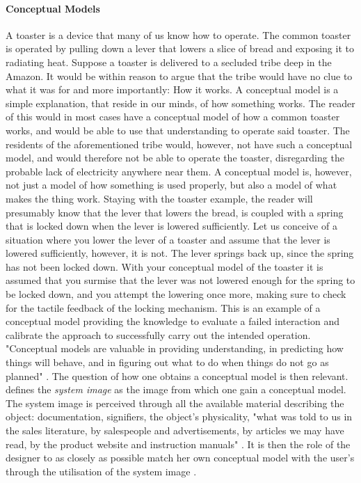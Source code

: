 \paragraph{Conceptual Models} A toaster is a device that many of us know how to operate. The common toaster is operated by pulling down a lever that lowers a slice of bread and exposing it to radiating heat. Suppose a toaster is delivered to a secluded tribe deep in the Amazon. It would be within reason to argue that the tribe would have no clue to what it was for and more importantly: How it works. A conceptual model is a simple explanation, that reside in our minds, of how something works. The reader of this would in most cases have a conceptual model of how a common toaster works, and would be able to use that understanding to operate said toaster. The residents of the aforementioned tribe would, however, not have such a conceptual model, and would therefore not be able to operate the toaster, disregarding the probable lack of electricity anywhere near them. A conceptual model is, however, not just a model of how something is used properly, but also a model of what makes the thing work. Staying with the toaster example, the reader will presumably know that the lever that lowers the bread, is coupled with a spring that is locked down when the lever is lowered sufficiently. Let us conceive of a situation where you lower the lever of a toaster and assume that the lever is lowered sufficiently, however, it is not. The lever springs back up, since the spring has not been locked down. With your conceptual model of the toaster it is assumed that you surmise that the lever was not lowered enough for the spring to be locked down, and you attempt the lowering once more, making sure to check for the tactile feedback of the locking mechanism. This is an example of a conceptual model providing the knowledge to evaluate a failed interaction and calibrate the approach to successfully carry out the intended operation. "Conceptual models are valuable in providing understanding, in predicting how things will behave, and in figuring out what to do when things do not go as planned" \cite[p. 28]{norman}. The question of how one obtains a conceptual model is then relevant.  defines the \textit{system image} as the image from which one gain a conceptual model. The system image is perceived through all the available material describing the object: documentation, signifiers, the object's physicality, "what was told to us in the sales literature, by salespeople and advertisements, by articles we may have read, by the product website and instruction manuals" \cite[p. 31]{norman}. It is then the role of the designer to as closely as possible match her own conceptual model with the user's through the utilisation of the system image \cite{norman}.

